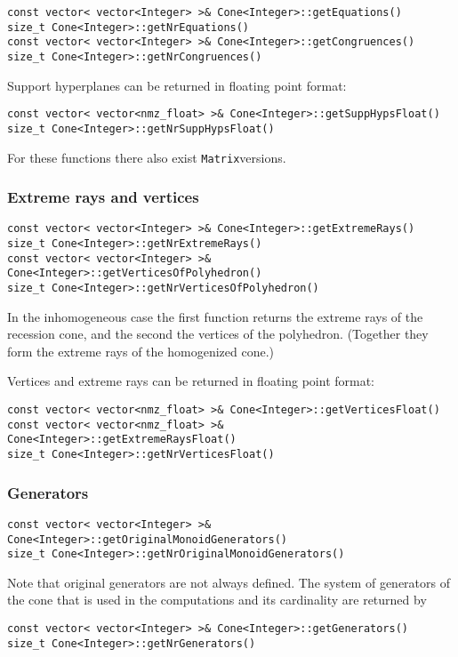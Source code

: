 \documentclass[12pt,a4paper]{scrartcl}
\theoremstyle{definition}
\def\ttt{\texttt}
\begin{document}
\begin{small}
\begin{Verbatim}
const vector< vector<Integer> >& Cone<Integer>::getEquations()
size_t Cone<Integer>::getNrEquations()
const vector< vector<Integer> >& Cone<Integer>::getCongruences()
size_t Cone<Integer>::getNrCongruences()
\end{Verbatim}

Support hyperplanes can be returned in floating point format:
\begin{Verbatim}
const vector< vector<nmz_float> >& Cone<Integer>::getSuppHypsFloat()
size_t Cone<Integer>::getNrSuppHypsFloat()
\end{Verbatim}

For these functions there also exist \ttt{Matrix}versions.

\subsubsection{Extreme rays and vertices}

\begin{Verbatim}
const vector< vector<Integer> >& Cone<Integer>::getExtremeRays()
size_t Cone<Integer>::getNrExtremeRays()
const vector< vector<Integer> >& Cone<Integer>::getVerticesOfPolyhedron()
size_t Cone<Integer>::getNrVerticesOfPolyhedron()
\end{Verbatim}

In the inhomogeneous case the first function returns the extreme rays of the recession cone, and the second the vertices of the polyhedron. (Together they form the extreme rays of the homogenized cone.)

Vertices and extreme rays can be returned in floating point format:
\begin{Verbatim}
const vector< vector<nmz_float> >& Cone<Integer>::getVerticesFloat()
const vector< vector<nmz_float> >& Cone<Integer>::getExtremeRaysFloat()
size_t Cone<Integer>::getNrVerticesFloat()
\end{Verbatim}

\subsubsection{Generators}

\begin{Verbatim}
const vector< vector<Integer> >& Cone<Integer>::getOriginalMonoidGenerators()
size_t Cone<Integer>::getNrOriginalMonoidGenerators()
\end{Verbatim}
Note that original generators are not always defined. The system of generators of the cone that is used in the computations and its cardinality are returned by
\begin{Verbatim}
const vector< vector<Integer> >& Cone<Integer>::getGenerators()
size_t Cone<Integer>::getNrGenerators()
\end{Verbatim}


\end{small}
\end{document}

